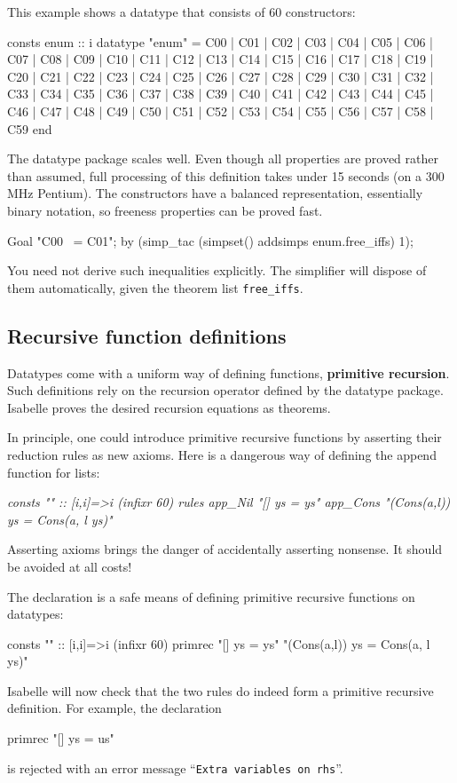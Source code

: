 This example shows a datatype that consists of 60 constructors:
\begin{ttbox}
consts  enum :: i
datatype
  "enum" = C00 | C01 | C02 | C03 | C04 | C05 | C06 | C07 | C08 | C09
         | C10 | C11 | C12 | C13 | C14 | C15 | C16 | C17 | C18 | C19
         | C20 | C21 | C22 | C23 | C24 | C25 | C26 | C27 | C28 | C29
         | C30 | C31 | C32 | C33 | C34 | C35 | C36 | C37 | C38 | C39
         | C40 | C41 | C42 | C43 | C44 | C45 | C46 | C47 | C48 | C49
         | C50 | C51 | C52 | C53 | C54 | C55 | C56 | C57 | C58 | C59
end
\end{ttbox}
The datatype package scales well.  Even though all properties are proved
rather than assumed, full processing of this definition takes under 15 seconds
(on a 300 MHz Pentium).  The constructors have a balanced representation,
essentially binary notation, so freeness properties can be proved fast.
\begin{ttbox}
Goal "C00 ~= C01";
by (simp_tac (simpset() addsimps enum.free_iffs) 1);
\end{ttbox}
You need not derive such inequalities explicitly.  The simplifier will dispose
of them automatically, given the theorem list \texttt{free_iffs}.



\subsection{Recursive function definitions}\label{sec:ZF:recursive}

Datatypes come with a uniform way of defining functions, {\bf primitive
  recursion}.  Such definitions rely on the recursion operator defined by the
datatype package.  Isabelle proves the desired recursion equations as
theorems.

In principle, one could introduce primitive recursive functions by asserting
their reduction rules as new axioms.  Here is a dangerous way of defining the
append function for lists:
\begin{ttbox}\slshape
consts  "\at" :: [i,i]=>i                        (infixr 60)
rules 
   app_Nil   "[] \at ys = ys"
   app_Cons  "(Cons(a,l)) \at ys = Cons(a, l \at ys)"
\end{ttbox}
Asserting axioms brings the danger of accidentally asserting nonsense.  It
should be avoided at all costs!

The  declaration is a safe means of defining primitive
recursive functions on datatypes:
\begin{ttbox}
consts  "\at" :: [i,i]=>i                        (infixr 60)
primrec 
   "[] \at ys = ys"
   "(Cons(a,l)) \at ys = Cons(a, l \at ys)"
\end{ttbox}
Isabelle will now check that the two rules do indeed form a primitive
recursive definition.  For example, the declaration
\begin{ttbox}
primrec
   "[] \at ys = us"
\end{ttbox}
is rejected with an error message ``\texttt{Extra variables on rhs}''.


